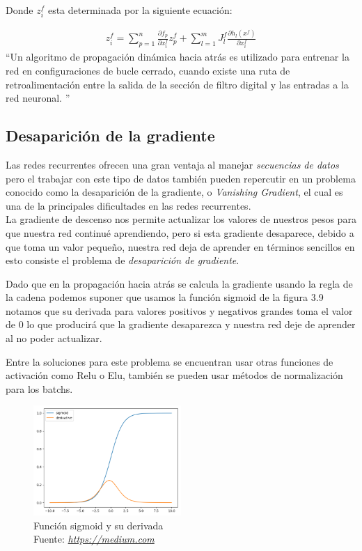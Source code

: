 Donde $z_{i}^f$ esta determinada por la siguiente ecuación:

\begin{equation}
\begin{aligned}
z_{i}^f =\sum_{p=1}^{n} \frac{\partial f_{p}}{\partial x_{i}^f}z_{p}^{f} + \sum_{l=1}^{m} J_{l}^f \frac{\partial h_{l}(x^f)}{\partial x_{i}^f}
\end{aligned}
\end{equation}
\newpage
\textquotedblleft Un algoritmo de propagación dinámica hacia atrás es utilizado para entrenar la red en configuraciones de bucle cerrado, cuando existe una ruta de retroalimentación entre la salida de la sección de filtro digital y las entradas a la red neuronal. \textquotedblright \cite{DBP}
\subsection{Desaparición de la gradiente}
Las redes recurrentes ofrecen una gran ventaja al manejar \textit{secuencias de datos} pero el trabajar con este tipo de datos también pueden repercutir en un problema conocido como la desaparición de la gradiente, o \textit{Vanishing Gradient}, el cual es una de la principales dificultades en las redes recurrentes.\\
 La gradiente de descenso nos permite actualizar los valores de nuestros pesos para que nuestra red continué aprendiendo, pero si esta gradiente desaparece, debido a que toma un valor pequeño, nuestra red deja de aprender en términos sencillos en esto consiste el problema de \textit{desaparición de gradiente}.

Dado que en la propagación hacia atrás se calcula la gradiente usando la regla de la cadena podemos suponer que usamos la función sigmoid de la figura 3.9 notamos que su derivada para valores positivos y negativos grandes toma el valor de 0 lo que producirá que la gradiente desaparezca y nuestra red deje de aprender al no poder actualizar.

Entre la soluciones para este problema se encuentran usar otras funciones de activación como Relu o Elu, también se pueden usar métodos de normalización para los batchs.
\begin{figure}[H]
	\centering
	\includegraphics[width=0.5\textwidth]{Figures/sigmoid.png}
	\caption{Función sigmoid y su derivada \\ Fuente:  \href{https://cdn-images-1.medium.com/max/960/1*XB5c4rTCSeFQrK0aFC5IVw.png}{\textit{https://medium.com}}}
	\label{}
\end{figure}

